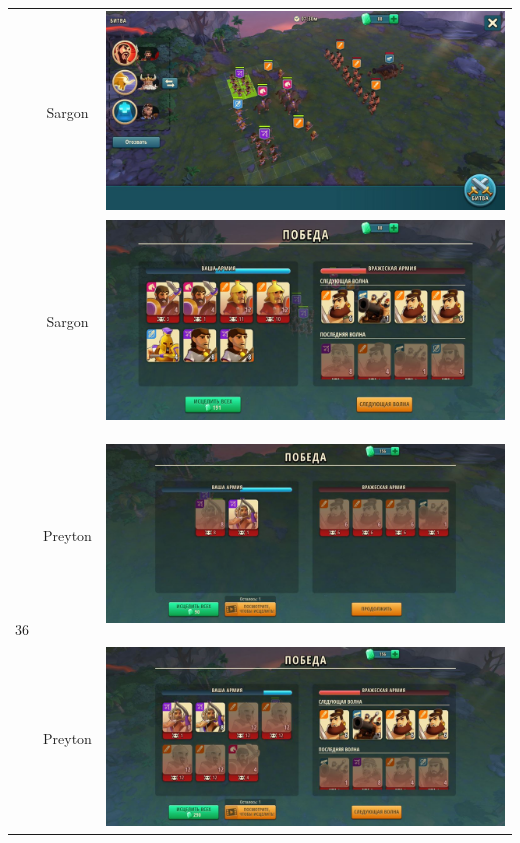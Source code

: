 \begin{longtable}{|c|c|c|}
	& Sargon &
	\includegraphics[width=0.75\linewidth]{./parts/media/TreasureHunt/36/sargon/photo_2022-04-07_13-16-43.jpg} \\
	& Sargon &
	\includegraphics[width=0.75\linewidth]{./parts/media/TreasureHunt/36/sargon/photo_2022-04-07_13-16-40.jpg} \\
	\hline
	\multirow{16}{*}{36} & Preyton &
	\hypertarget{fight36}{\includegraphics[width=0.75\linewidth]{./parts/media/TreasureHunt/36/Preyton/36_2.jpg}} \\
	& Preyton &
	\includegraphics[width=0.75\linewidth]{./parts/media/TreasureHunt/36/Preyton/36_1.jpg} \\

\end{longtable}
